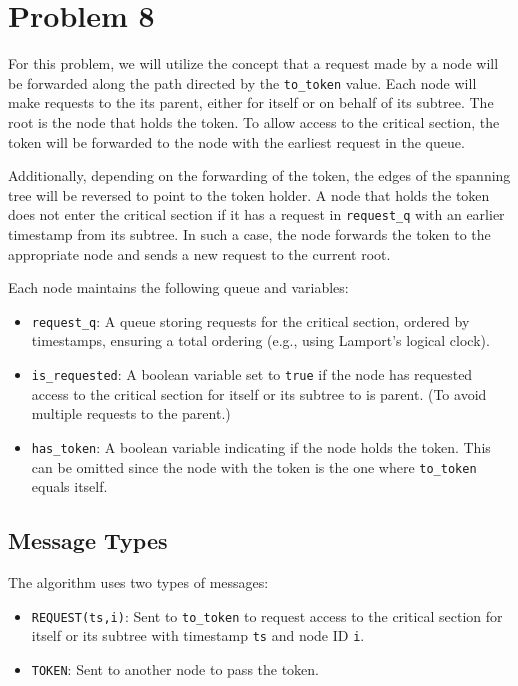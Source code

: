 \section{Problem 8}\label{prob8}

For this problem, we will utilize the concept that a request made by a node will be forwarded along the path directed by the \texttt{to\_token} value. Each node will make requests to the its parent, either for itself or on behalf of its subtree. The root is the node that holds the token. To allow access to the critical section, the token will be forwarded to the node with the earliest request in the queue. 

Additionally, depending on the forwarding of the token, the edges of the spanning tree will be reversed to point to the token holder. A node that holds the token does not enter the critical section if it has a request in \texttt{request\_q} with an earlier timestamp from its subtree. In such a case, the node forwards the token to the appropriate node and sends a new request to the current root.

Each node maintains the following queue and variables:
\begin{itemize}
    \item \texttt{request\_q}: A queue storing requests for the critical section, ordered by timestamps, ensuring a total ordering (e.g., using Lamport's logical clock).
    \item \texttt{is\_requested}: A boolean variable set to \texttt{true} if the node has requested access to the critical section for itself or its subtree to is parent. (To avoid multiple requests to the parent.)
    \item \texttt{has\_token}: A boolean variable indicating if the node holds the token. This can be omitted since the node with the token is the one where \texttt{to\_token} equals itself.
\end{itemize}

\subsection{Message Types}
The algorithm uses two types of messages:

\begin{itemize}
    \item \texttt{REQUEST(ts,i)}: Sent to \texttt{to\_token} to request access to the critical section for itself or its subtree with timestamp \texttt{ts} and node ID \texttt{i}.
    \item \texttt{TOKEN}: Sent to another node to pass the token.
\end{itemize}

